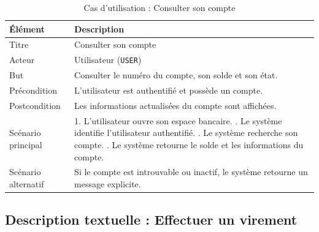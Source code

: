 \begin{table}[htbp]
\centering
\caption{Cas d'utilisation : Consulter son compte}
\label{tab:uc_compte_sprint3}
\renewcommand{\arraystretch}{1.3}
\begin{tabular}{|p{3.2cm}|p{10.5cm}|}
\hline
\textbf{Élément} & \textbf{Description} \\
\hline
Titre & Consulter son compte \\
\hline
Acteur & Utilisateur (\texttt{USER}) \\
\hline
But & Consulter le numéro du compte, son solde et son état. \\
\hline
Précondition & L'utilisateur est authentifié et possède un compte. \\
\hline
Postcondition & Les informations actualisées du compte sont affichées. \\
\hline
Scénario principal &
1. L'utilisateur ouvre son espace bancaire. \newline
2. Le système identifie l'utilisateur authentifié. \newline
3. Le système recherche son compte. \newline
4. Le système retourne le solde et les informations du compte. \\
\hline
Scénario alternatif & Si le compte est introuvable ou inactif, le système retourne un message explicite. \\
\hline
\end{tabular}
\end{table}

\subsection{Description textuelle : Effectuer un virement}
\label{subsec:desc_virement_sprint3}

